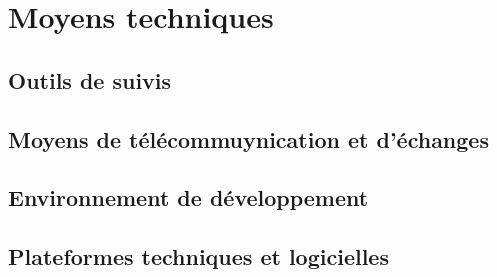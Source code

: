 	\section{Moyens techniques}
	\subsection{Outils de suivis}
	\subsection{Moyens de télécommuynication et d'échanges}
	\subsection{Environnement de développement}
	\subsection{Plateformes techniques et logicielles}